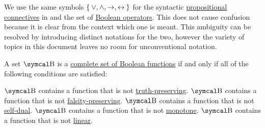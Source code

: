 \begin{remark}\label{rem:propositional_connectives_ambiguity}
  We use the same symbols \( \Set{ \vee, \wedge, \rightarrow, \leftrightarrow } \) for the syntactic \hyperref[def:propositional_alphabet/connectives]{propositional connectives} in  and the set of \hyperref[def:standard_boolean_operators]{Boolean operators}. This does not cause confusion because it is clear from the context which one is meant. This ambiguity can be resolved by introducing distinct notations for the two, however the variety of topics in this document leaves no room for unconventional notation.
\end{remark}

\begin{theorem}\label{thm:posts_completeness_theorem}
  A set \( \CB \) is a \hyperref[def:boolean_closure]{complete set of Boolean functions} if and only if all of the following conditions are satisfied:
  \begin{PropEnum}
     \( \CB \) contains a function that is not \hyperref[def:boolean_functions_in_f2/truth_preserving]{truth-preserving}.
     \( \CB \) contains a function that is not \hyperref[def:boolean_functions_in_f2/falsity_preserving]{falsity-preserving}.
     \( \CB \) contains a function that is not \hyperref[def:boolean_functions_in_f2/self_dual]{self-dual}.
     \( \CB \) contains a function that is not \hyperref[def:boolean_functions_in_f2/monotone]{monotone}.
     \( \CB \) contains a function that is not \hyperref[def:boolean_functions_in_f2/linear]{linear}.
  \end{PropEnum}
\end{theorem}

